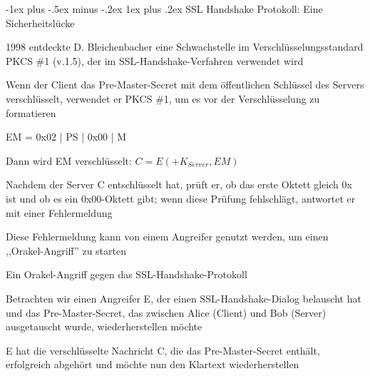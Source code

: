 \documentclass[a4paper]{article}
\makeatletter
\renewcommand{\subsubsection}{\@startsection{subsubsection}{3}{0mm}%
 {-1ex plus -.5ex minus -.2ex}%
 {1ex plus .2ex}%
 {\normalfont\small\bfseries}}
\makeatother
\begin{document}
\begin{multicols}{3}
      \subsubsection{SSL Handshake Protokoll: Eine Sicherheitslücke}
      \begin{itemize*}
            \item 1998 entdeckte D. Bleichenbacher eine Schwachstelle im Verschlüsselungsstandard PKCS \#1 (v.1.5), der im SSL-Handshake-Verfahren verwendet wird
            \item Wenn der Client das Pre-Master-Secret mit dem öffentlichen Schlüssel des Servers verschlüsselt, verwendet er PKCS \#1, um es vor der Verschlüsselung zu formatieren
            \begin{itemize*}
                  \item EM = 0x02 | PS | 0x00 | M
                  \item Dann wird EM verschlüsselt: $C = E(+K_{Server}, EM)$
                  \item Nachdem der Server C entschlüsselt hat, prüft er, ob das erste Oktett gleich 0x ist und ob es ein 0x00-Oktett gibt; wenn diese Prüfung fehlschlägt, antwortet er mit einer Fehlermeldung
                  \item Diese Fehlermeldung kann von einem Angreifer genutzt werden, um einen ,,Orakel-Angriff'' zu starten
            \end{itemize*}
            \item Ein Orakel-Angriff gegen das SSL-Handshake-Protokoll
            \begin{itemize*}
                  \item Betrachten wir einen Angreifer E, der einen SSL-Handshake-Dialog belauscht hat und das Pre-Master-Secret, das zwischen Alice (Client) und Bob (Server) ausgetauscht wurde, wiederherstellen möchte
                  \item E hat die verschlüsselte Nachricht C, die das Pre-Master-Secret enthält, erfolgreich abgehört und möchte nun den Klartext wiederherstellen

\end{itemize*}
\end{itemize*}
\end{multicols}
\end{document}
